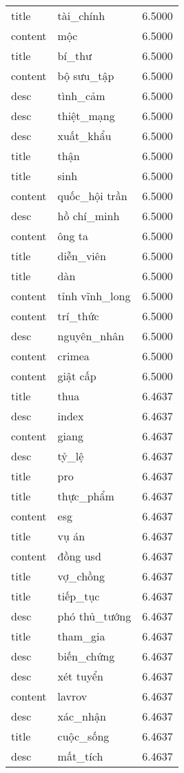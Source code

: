 \documentclass{article}
\begin{document}
\begin{tabular}{lll}
title & tài\_chính & 6.5000\\
content & mộc & 6.5000\\
title & bí\_thư & 6.5000\\
content & bộ sưu\_tập & 6.5000\\
desc & tình\_cảm & 6.5000\\
desc & thiệt\_mạng & 6.5000\\
desc & xuất\_khẩu & 6.5000\\
title & thận & 6.5000\\
title & sinh & 6.5000\\
content & quốc\_hội trần & 6.5000\\
desc & hồ chí\_minh & 6.5000\\
content & ông ta & 6.5000\\
title & diễn\_viên & 6.5000\\
title & dàn & 6.5000\\
content & tỉnh vĩnh\_long & 6.5000\\
content & trí\_thức & 6.5000\\
desc & nguyên\_nhân & 6.5000\\
content & crimea & 6.5000\\
content & giật cấp & 6.5000\\
title & thua & 6.4637\\
desc & index & 6.4637\\
content & giang & 6.4637\\
desc & tỷ\_lệ & 6.4637\\
title & pro & 6.4637\\
title & thực\_phẩm & 6.4637\\
content & esg & 6.4637\\
title & vụ án & 6.4637\\
content & đồng usd & 6.4637\\
title & vợ\_chồng & 6.4637\\
title & tiếp\_tục & 6.4637\\
desc & phó thủ\_tướng & 6.4637\\
title & tham\_gia & 6.4637\\
desc & biến\_chứng & 6.4637\\
desc & xét tuyển & 6.4637\\
content & lavrov & 6.4637\\
desc & xác\_nhận & 6.4637\\
title & cuộc\_sống & 6.4637\\
desc & mất\_tích & 6.4637\\

\end{tabular}
\end{document}

